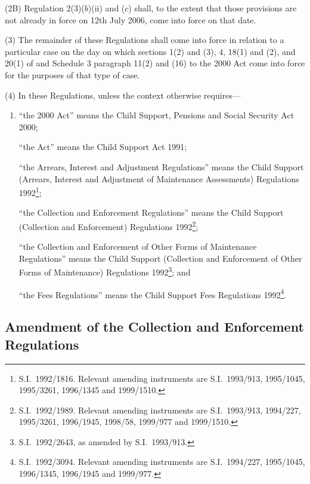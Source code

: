 \documentclass[12pt,a4paper]{article}
\begin{document}
(2B) Regulation 2(3)($b$)(ii) and ($c$)  shall, to the extent that those provisions are not already in force on 12th July 2006, come into force on that date.

(3) The remainder of these Regulations shall come into force in relation to a particular case on the day on which sections 1(2) and (3), 4, 18(1) and (2), and 20(1) of and Schedule 3 paragraph 11(2) and (16) to the 2000 Act come into force for the purposes of that type of case.

(4) In these Regulations, unless the context otherwise requires—
\begin{enumerate}\item[]
“the 2000 Act” means the Child Support, Pensions and Social Security Act 2000;

“the Act” means the Child Support Act 1991;

“the Arrears, Interest and Adjustment Regulations” means the Child Support (Arrears, Interest and Adjustment of Maintenance Assessments) Regulations 1992\footnote{S.I.\ 1992/1816. Relevant amending instruments are S.I.\ 1993/913, 1995/1045, 1995/3261, 1996/1345 and 1999/1510.};

“the Collection and Enforcement Regulations” means the Child Support (Collection and Enforcement) Regulations 1992\footnote{S.I.\ 1992/1989. Relevant amending instruments are S.I.\ 1993/913, 1994/227, 1995/3261, 1996/1945, 1998/58, 1999/977 and 1999/1510.};

“the Collection and Enforcement of Other Forms of Maintenance Regulations” means the Child Support (Collection and Enforcement of Other Forms of Maintenance) Regulations 1992\footnote{S.I.\ 1992/2643, as amended by S.I.\ 1993/913.}; and

“the Fees Regulations” means the Child Support Fees Regulations 1992\footnote{S.I.\ 1992/3094. Relevant amending instruments are S.I.\ 1994/227, 1995/1045, 1996/1345, 1996/1945 and 1999/977.}.
\end{enumerate}


\subsection[2. Amendment of the Collection and Enforcement Regulations]{Amendment of the Collection and Enforcement Regulations}
\end{document}
